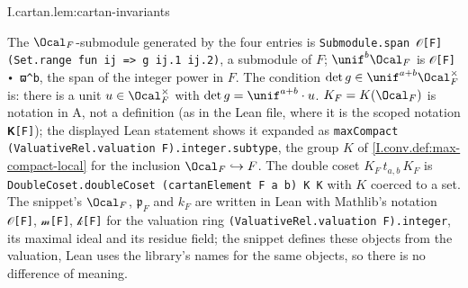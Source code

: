 \begin{lemma}
\end{lemma}
\begin{tfformal}{I.cartan.lem:cartan-invariants}
\begin{tffidelity}
The $\Ocal_F$-submodule generated by the four entries is \texttt{Submodule.span 𝒪[F] (Set.range fun ij => g ij.1 ij.2)}, a submodule of $F$; $\unif^b\Ocal_F$ is \texttt{𝒪[F] ∙ ϖ\^{}b}, the span of the integer power in $F$. The condition $\det g\in\unif^{a+b}\Ocal_F^\times$ is: there is a unit $u\in\Ocal_F^\times$ with $\det g=\unif^{a+b}\cdot u$. $K_F=K(\Ocal_F)$ is notation in A, not a definition (as in the Lean file, where it is the scoped notation \texttt{𝐊[F]}); the displayed Lean statement shows it expanded as \texttt{maxCompact (ValuativeRel.valuation F).integer.subtype}, the group $K$ of \cref{I.conv.def:max-compact-local} for the inclusion $\Ocal_F\hookrightarrow F$. The double coset $K_F\,t_{a,b}\,K_F$ is \texttt{DoubleCoset.doubleCoset (cartanElement F a b) K K} with $K$ coerced to a set. The snippet's $\Ocal_F$, $\mathfrak p_F$ and $k_F$ are written in Lean with Mathlib's notation \texttt{𝒪[F]}, \texttt{𝓂[F]}, \texttt{𝓀[F]} for the valuation ring \texttt{(ValuativeRel.valuation F).integer}, its maximal ideal and its residue field; the snippet defines these objects from the valuation, Lean uses the library's names for the same objects, so there is no difference of meaning.
\end{tffidelity}
\end{tfformal}
